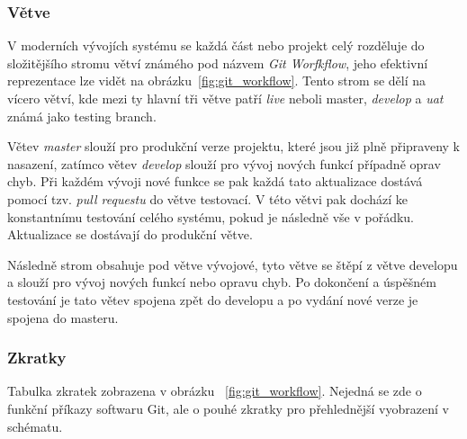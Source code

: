 \subsubsection*{Větve}
\label{subsubsec:implementation-collaboration-versioning-branches}
V moderních vývojích systému se každá část nebo projekt celý rozděluje do složitějšího stromu větví známého pod názvem \textit{Git Worfkflow}, jeho efektivní reprezentace lze vidět na obrázku~\ref{fig:git_workflow}. Tento strom se dělí na vícero větví, kde mezi ty hlavní tři větve patří \textit{live} neboli master, \textit{develop} a \textit{uat} známá jako testing branch.

Větev \textit{master} slouží pro produkční verze projektu, které jsou již plně připraveny k nasazení, zatímco větev \textit{develop} slouží pro vývoj nových funkcí případně oprav chyb. Při každém vývoji nové funkce se pak každá tato aktualizace dostává pomocí tzv. \textit{pull requestu} do větve testovací. V této větvi pak dochází ke konstantnímu testování celého systému, pokud je následně vše v pořádku. Aktualizace se dostávají do produkční větve.

Následně strom obsahuje pod větve vývojové, tyto větve se štěpí z větve developu a slouží pro vývoj nových funkcí nebo opravu chyb. Po dokončení a úspěšném testování je tato větev spojena zpět do developu a po vydání nové verze je spojena do masteru.

\subsubsection*{Zkratky}
Tabulka zkratek zobrazena v obrázku ~\ref{fig:git_workflow}. Nejedná se zde o funkční příkazy softwaru Git, ale o pouhé zkratky pro přehlednější vyobrazení v schématu.

